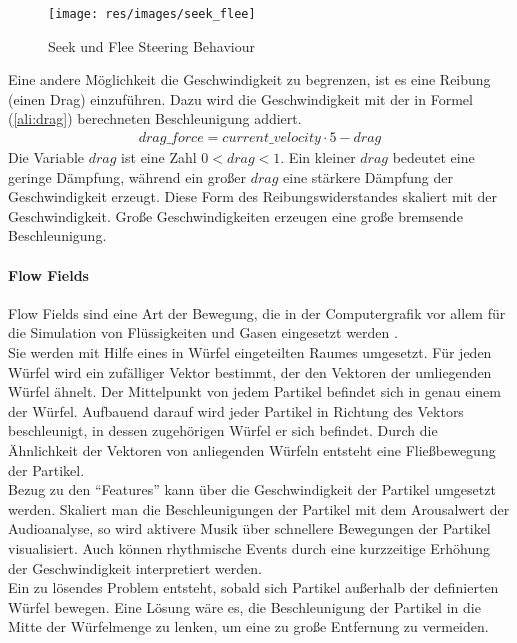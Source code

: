 \documentclass[11pt,a4paper]{article}
\begin{document}
\begin{figure}[ht!]
\centering
\texttt{[image: res/images/seek\_flee]}
\caption[Seek und Flee Steering Behaviour]{Seek und Flee Steering Behaviour
 \cite[S. 2]{580abc6c6615ef9f9c16f9069351938a0dda3c5120b7e8d1450d6b1abf0a71df}}
 \label{fig:seekflee}
\end{figure}
\noindent
Eine andere Möglichkeit die Geschwindigkeit zu begrenzen, ist es eine Reibung (einen Drag) einzuführen. Dazu wird die Geschwindigkeit mit der in Formel (\ref{ali:drag}) berechneten Beschleunigung addiert.
\begin{align}
drag\_force = current\_velocity \cdot5 -drag
\label{ali:drag}
\end{align}
\noindent
Die Variable $drag$ ist eine Zahl $0 < drag < 1$. Ein kleiner $drag$ bedeutet eine geringe Dämpfung, während ein großer $drag$ eine stärkere Dämpfung der Geschwindigkeit erzeugt. Diese Form des Reibungswiderstandes skaliert mit der Geschwindigkeit. Große Geschwindigkeiten erzeugen eine große bremsende Beschleunigung.

\paragraph{Flow Fields} Flow Fields sind eine Art der Bewegung, die in der Computergrafik vor allem für die Simulation von Flüssigkeiten und Gasen eingesetzt werden \cite{stam1999stable}.\\
Sie werden mit Hilfe eines in Würfel eingeteilten Raumes umgesetzt. Für jeden Würfel wird ein zufälliger Vektor bestimmt, der den Vektoren der umliegenden Würfel ähnelt. Der Mittelpunkt von jedem Partikel befindet sich in genau einem der Würfel. Aufbauend darauf wird jeder Partikel in Richtung des Vektors beschleunigt, in dessen zugehörigen Würfel er sich befindet. Durch die Ähnlichkeit der Vektoren von anliegenden Würfeln entsteht eine Fließbewegung der Partikel.\\
Bezug zu den ``Features'' kann über die Geschwindigkeit der Partikel umgesetzt werden. Skaliert man die Beschleunigungen der Partikel mit dem Arousalwert der Audioanalyse, so wird aktivere Musik über schnellere Bewegungen der Partikel visualisiert. Auch können rhythmische Events durch eine kurzzeitige Erhöhung der Geschwindigkeit interpretiert werden.\\
Ein zu lösendes Problem entsteht, sobald sich Partikel außerhalb der definierten Würfel bewegen. Eine Lösung wäre es, die Beschleunigung der Partikel in die Mitte der Würfelmenge zu lenken, um eine zu große Entfernung zu vermeiden.
\end{document}
